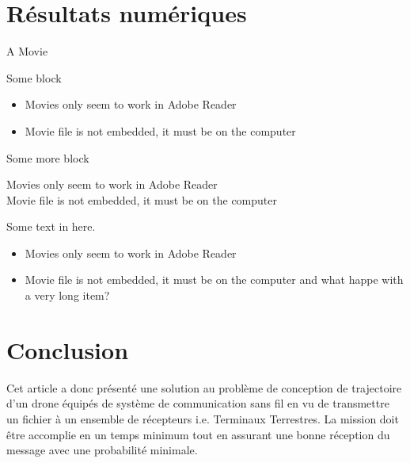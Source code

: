 \documentclass[utf8, a4paper]{beamer}
\begin{document}
\section{Résultats numériques}
\begin{frame}{A Movie}

  \begin{block} {Some block}

    \begin{itemize}
    \item Movies only seem to work in Adobe Reader
    \item Movie file is not embedded, it must be on the computer
    \end{itemize}
  \end{block}

  \pause
  \begin{alertblock}
    {Some more block}

    Movies only seem to work in Adobe Reader\\
    Movie file is not embedded, it must be on the computer
  \end{alertblock}
  \pause

  \begin{exampleblock}{}
    Some text in here.

    \begin{itemize}[<+->]
    \item Movies only seem to work in Adobe Reader
    \item Movie file is not embedded, it must be on the computer and
      what happe with a very long item?
    \end{itemize}
  \end{exampleblock}
\end{frame}


\section
  {Conclusion}


\begin{frame} {}

Cet article a donc présenté une solution au problème de conception
de trajectoire d'un drone équipés de système de communication sans fil
en vu de transmettre un fichier à un ensemble de récepteurs i.e. Terminaux Terrestres. 
La mission doit être accomplie en un temps minimum tout en assurant une bonne réception
du message avec une probabilité minimale.

\end{frame}
\end{document}
